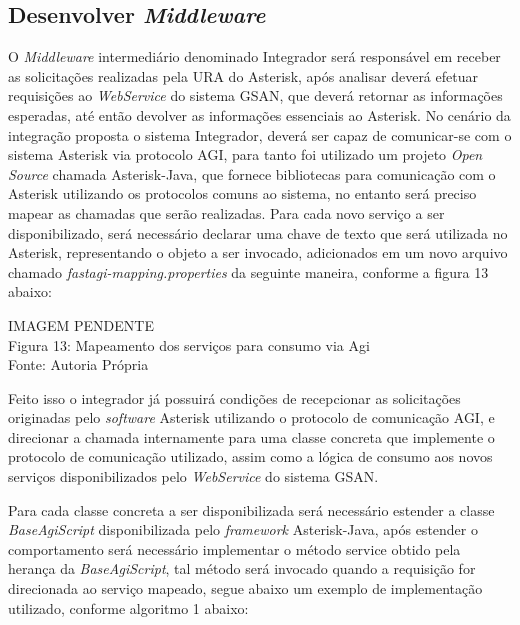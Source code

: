 \subsection{Desenvolver \textit{Middleware}}

O \textit{Middleware} intermediário denominado Integrador será responsável em receber as solicitações realizadas pela URA do Asterisk, após analisar deverá efetuar requisições ao \textit{WebService} do sistema GSAN, que deverá retornar as informações esperadas, até então devolver as informações essenciais ao Asterisk.
No cenário da integração proposta o sistema Integrador, deverá ser capaz de comunicar-se com o sistema Asterisk via protocolo AGI, para tanto foi utilizado um projeto \textit{Open Source} chamada Asterisk-Java, que fornece bibliotecas para comunicação com o Asterisk utilizando os protocolos comuns ao sistema, no entanto será preciso mapear as chamadas que serão realizadas.
Para cada novo serviço a ser disponibilizado, será necessário declarar uma chave de texto que será utilizada no Asterisk, representando o objeto a ser invocado, adicionados em um novo arquivo chamado \textit{fastagi-mapping.properties} da seguinte maneira, conforme a figura 13 abaixo:

\begin{center}
	IMAGEM PENDENTE \\
	Figura 13: Mapeamento dos serviços para consumo via Agi	\\
	Fonte: Autoria Própria\\	
\end{center}

Feito isso o integrador já possuirá condições de recepcionar as solicitações originadas pelo \textit{software} Asterisk utilizando o protocolo de comunicação AGI, e direcionar a chamada internamente para uma classe concreta que implemente o protocolo de comunicação utilizado, assim como a lógica de consumo aos novos serviços disponibilizados pelo \textit{WebService} do sistema GSAN.

Para cada classe concreta a ser disponibilizada será necessário estender a classe \textit{BaseAgiScript} disponibilizada pelo \textit{framework} Asterisk-Java, após estender o comportamento será necessário implementar o método service obtido pela herança da \textit{BaseAgiScript}, tal método será invocado quando a requisição for direcionada ao serviço mapeado, segue abaixo um exemplo de implementação utilizado, conforme algoritmo 1 abaixo:


